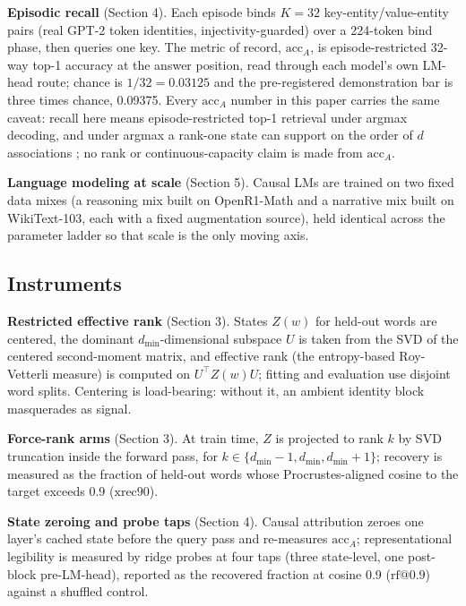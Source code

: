\textbf{Episodic recall} (Section 4). Each episode binds $K{=}32$
key-entity/value-entity pairs (real GPT-2 token identities,
injectivity-guarded) over a 224-token bind phase, then queries one key. The metric of record, $\mathrm{acc}_A$, is
episode-restricted 32-way top-1 accuracy at the answer position, read
through each model's own LM-head route; chance is $1/32 = 0.03125$ and
the pre-registered demonstration bar is three times chance, 0.09375. Every $\mathrm{acc}_A$ number in this paper
carries the same caveat: recall here means episode-restricted top-1
retrieval under argmax decoding, and under argmax a rank-one state can
support on the order of $d$ associations \citep{nichani2024understandingfactualrecalltransformers}; no
rank or continuous-capacity claim is made from $\mathrm{acc}_A$.

\textbf{Language modeling at scale} (Section 5). Causal LMs are trained on
two fixed data mixes (a reasoning mix built on OpenR1-Math and a
narrative mix built on WikiText-103, each with a fixed augmentation
source), held identical across the parameter ladder so that scale is
the only moving axis.

\subsection{Instruments}

\textbf{Restricted effective rank} (Section 3). States $Z(w)$ for held-out
words are centered, the dominant $d_{\min}$-dimensional subspace $U$ is
taken from the SVD of the centered second-moment matrix, and effective
rank (the entropy-based Roy-Vetterli measure) is computed on
$U^{\top} Z(w) U$; fitting and evaluation use disjoint word splits.
Centering is load-bearing: without it, an ambient identity block
masquerades as signal.

\textbf{Force-rank arms} (Section 3). At train time, $Z$ is projected to rank
$k$ by SVD truncation inside the forward pass, for
$k \in \{d_{\min}-1, d_{\min}, d_{\min}+1\}$; recovery is measured as
the fraction of held-out words whose Procrustes-aligned cosine to the
target exceeds 0.9 ($\mathrm{xrec90}$).

\textbf{State zeroing and probe taps} (Section 4). Causal attribution zeroes
one layer's cached state before the query pass and re-measures
$\mathrm{acc}_A$; representational legibility is measured by ridge
probes at four taps (three state-level, one post-block pre-LM-head),
reported as the recovered fraction at cosine 0.9 ($\mathrm{rf@0.9}$)
against a shuffled control.

